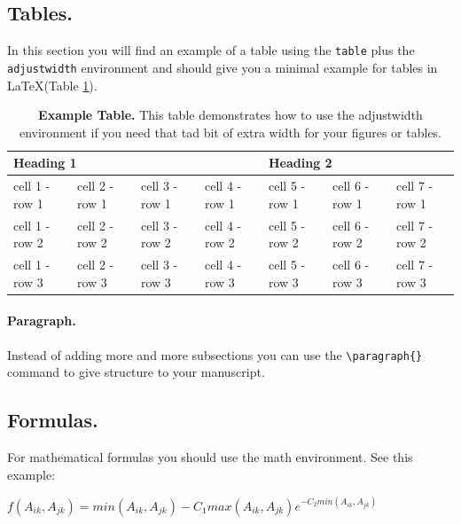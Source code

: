 \documentclass[10pt,letterpaper]{article}
\begin{document}
\subsection*{Tables.} 

In this section you will find an example of a table using the \verb!table! plus the \verb!adjustwidth! environment and should give you a minimal example for tables in \LaTeX (Table \ref{tab1}).

\begin{table}[!ht]
\begin{adjustwidth}{-1.5in}{0in} %
\centering
\caption{{\bf Example Table.} This table demonstrates how to use the  adjustwidth environment if you need that tad bit of extra width for your figures or tables.}
\begin{tabular}{|l|l|l|l|l|l|l|}
\hline
\multicolumn{4}{|l|}{\bf Heading 1} & \multicolumn{3}{|l|}{\bf Heading 2}\\ \hline
cell 1 - row 1 & cell 2 - row 1 & cell 3 - row 1 & cell 4 - row 1 & cell 5 - row 1 & cell 6 - row 1 & cell 7 - row 1 \\ \hline
cell 1 - row 2 & cell 2 - row 2 & cell 3 - row 2 & cell 4 - row 2 & cell 5 - row 2 & cell 6 - row 2 & cell 7 - row 2 \\ \hline
cell 1 - row 3 & cell 2 - row 3 & cell 3 - row 3 & cell 4 - row 3 & cell 5 - row 3 & cell 6 - row 3 & cell 7 - row 3 \\ \hline
\end{tabular}
\label{tab1}
\end{adjustwidth}
\end{table}

\paragraph{Paragraph.}
Instead of adding more and more subsections you can use the \verb!\paragraph{}! command to give structure to your manuscript.

\subsection*{Formulas.}
For mathematical formulas you should use the math environment. See this example:

\begin{center}
$f(A_{ik},A_{jk}) = min(A_{ik},A_{jk}) - C_{1} max(A_{ik},A_{jk}) e^{-C_{2}min(A_{ik},A_{jk})}$
\end{center}
\end{document}
